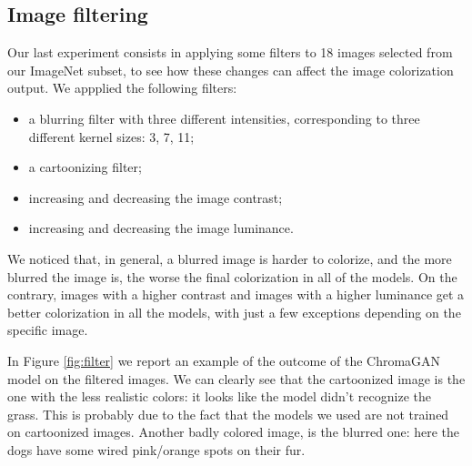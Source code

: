 \subsection{Image filtering}
Our last experiment consists in applying some filters to 18 images selected from our ImageNet subset, to see how
these changes can affect the image colorization output.
We appplied the following filters:
\begin{itemize}
	\item a blurring filter with three different intensities, corresponding to three different kernel sizes: 3, 7, 11;
	\item a cartoonizing filter;
	\item increasing and decreasing the image contrast;
	\item increasing and decreasing the image luminance.
\end{itemize}

We noticed that, in general, a blurred image is harder to colorize, and the more blurred the image is, the worse
the final colorization in all of the models.
On the contrary, images with a higher contrast and images with a higher luminance get a better colorization
in all the models, with just a few exceptions depending on the specific image.

In Figure \ref{fig:filter} we report an example of the outcome of the ChromaGAN model on the filtered images. We
can clearly see that the cartoonized image is the one with the less realistic colors: it looks like the model
didn't recognize the grass. This is probably due to the fact that the models we used are not trained on
cartoonized images. Another badly colored image, is the blurred one: here the dogs have some wired pink/orange
spots on their fur.

